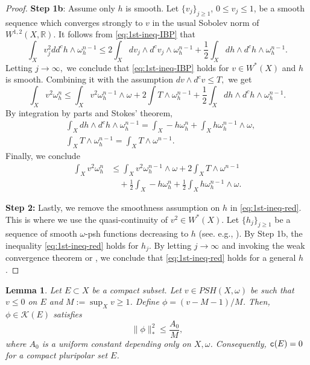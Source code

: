 \documentclass{amsart}
\newcommand{\om}{\omega}
\newcommand{\tc}{{\tt c}}
\newcommand{\bR}{\mathbb{R}}
\newcommand{\cali}[1]{\mathscr{#1}}
\newcommand{\Kc}{\cali{K}}
\newtheorem{lem}[thm]{Lemma}
\theoremstyle{definition}
\numberwithin{thm}{section}
\numberwithin{equation}{section}
\renewcommand{\[}{\begin{equation}}
\renewcommand{\]}{\end{equation}}
\newcommand{\wed}{\wedge}
\begin{document}
\begin{proof}
{\bf Step 1b}: Assume only $h$ is smooth. Let $\{v_j\}_{j\geq 1}$, $0\leq v_j \leq 1$, be a smooth sequence which converges strongly to $v$ in the usual Sobolev norm of $W^{1,2}(X,\bR)$. It follows from \eqref{eq:1st-ineq-IBP}  that
$$
	\int_X v_j^2 dd^c h \wed \om_h^{n-1} \leq 2 \int_X dv_j \wed d^c v_j \wed \om_h^{n-1}+  \frac{1}{2} \int_X dh \wed d^c h \wed \om_h^{n-1}.
$$
Letting $j\to \infty,$ we conclude that  \eqref{eq:1st-ineq-IBP} holds for $v\in W^*(X)$ and $h$ is smooth. Combining it with the assumption $dv\wed d^c v \leq T,$ we get
$$
	\int_X v^2 \om_h^n  \leq \int_X v^2 \om_h^{n-1}\wed \om + 2 \int T \wed \om_h^{n-1} +  \frac{1}{2} \int_X dh \wed d^c h \wed \om_h^{n-1}.
$$
By  integration by parts and Stokes' theorem,
$$\begin{aligned}
&	\int_X dh\wed d^c h \wed \om_h^{n-1} = \int_X -h \om_h^n + \int_X h \om_h^{n-1} \wed \om, \\
&	\int_X T\wed \om_h^{n-1} = \int_X T\wed \om^{n-1}.
\end{aligned}$$
 Finally, we conclude 
\[ \label{eq:1st-ineq-red}\begin{aligned}
	\int_X v^2 \om_h^n 
&\leq 	\int_X v^2 \om_h^{n-1}\wed \om  	+ 2 \int_X T \wed\om^{n-1} \\ 
&\quad 	+ \frac{1}{2} \int_X -h \om_h^n + \frac{1}{2} \int_X h \om_h^{n-1}\wed \om.
\end{aligned}\]

{\bf Step 2:} Lastly, we remove the smoothness assumption on $h$ in \eqref{eq:1st-ineq-red}. This is where we use the quasi-continuity of $v^2 \in W^*(X)$. Let $\{h_j\}_{j\geq 1}$ be a sequence of smooth $\om$-psh functions decreasing to $h$ (see. e.g., \cite{BK07}). 
By Step 1b, the inequality \eqref{eq:1st-ineq-red} holds for $h_j$. By letting  $j\to \infty$  and  invoking the weak convergence theorem  \cite[Theorem~3.2]{BT87} or \cite[Theorem~4.26]{GZ-book}, we conclude that \eqref{eq:1st-ineq-red} holds for a  general $h$. 
\end{proof}

\begin{lem}\label{lem:star-norm-SZ} Let $E\subset X$ be a compact subset. Let $v \in PSH(X,\om)$ be such that $v \leq 0$ on $E$ and $M:=\sup_X v \geq 1$. Define $\phi = (v-M-1)/M$. Then, $\phi\in \Kc(E)$ satisfies
$$
	\|\phi\|_*^2 \leq \frac{A_0}{M},
$$
where $A_0$ is a uniform constant  depending only on $X,\om$.
Consequently, $\tc (E) =0$ for  a compact pluripolar set $E$. 
\end{lem}
\end{document}
